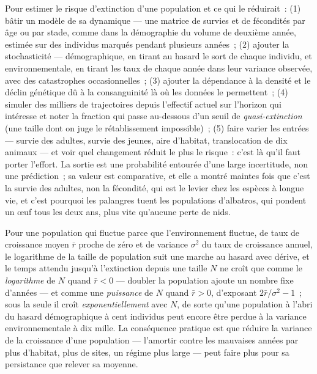 \begin{method}\label{met:b3:conservation-biology:pva}
Pour estimer le risque d'extinction d'une population et ce qui le
réduirait~: (1) bâtir un modèle de sa dynamique --- une matrice de
survies et de fécondités par âge ou par stade, comme dans la démographie
du volume de deuxième année, estimée sur des individus marqués pendant
plusieurs années~; (2) ajouter la stochasticité --- démographique, en
tirant au hasard le sort de chaque individu, et environnementale, en
tirant les taux de chaque année dans leur variance observée, avec des
catastrophes occasionnelles~; (3) ajouter la dépendance à la densité et
le déclin génétique dû à la consanguinité là où les données le
permettent~; (4) simuler des milliers de trajectoires depuis l'effectif
actuel sur l'horizon qui intéresse et noter la fraction qui passe
au-dessous d'un seuil de \emph{quasi-extinction} (une taille dont on
juge le rétablissement impossible)~; (5) faire varier les entrées ---
survie des adultes, survie des jeunes, aire d'habitat, translocation de
dix animaux --- et voir quel changement réduit le plus le risque~: c'est
là qu'il faut porter l'effort. La sortie est une probabilité entourée
d'une large incertitude, non une prédiction~; sa valeur est
comparative, et elle a montré maintes fois que c'est la survie des
adultes, non la fécondité, qui est le levier chez les espèces à longue
vie, et c'est pourquoi les palangres tuent les populations d'albatros,
qui pondent un œuf tous les deux ans, plus vite qu'aucune perte de nids.
\end{method}

\begin{proposition}\label{prop:b3:conservation-biology:time}
Pour une population qui fluctue parce que l'environnement fluctue, de
taux de croissance moyen $\bar r$ proche de zéro et de variance
$\sigma^{2}$ du taux de croissance annuel, le logarithme de la taille de
population suit une marche au hasard avec dérive, et le temps attendu
jusqu'à l'extinction depuis une taille $N$ ne croît que comme le
\emph{logarithme} de $N$ quand $\bar r < 0$ --- doubler la population
ajoute un nombre fixe d'années --- et comme une \emph{puissance} de $N$
quand $\bar r > 0$, d'exposant $2\bar r/\sigma^{2} - 1$~; sous la seule
 il croît \emph{exponentiellement} avec $N$,
de sorte qu'une population à l'abri du hasard démographique à cent
individus peut encore être perdue à la variance environnementale à dix
mille. La conséquence pratique est que réduire la variance de la
croissance d'une population --- l'amortir contre les mauvaises années
par plus d'habitat, plus de sites, un régime plus large --- peut faire
plus pour sa persistance que relever sa moyenne.
\end{proposition}
\admitted

